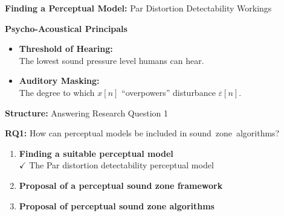 \documentclass[aspectratio=169]{beamer}
\begin{document}
\begin{frame}{\textbf{Finding a Perceptual Model:} Par Distortion Detectability Workings}
    \begin{block}
        {\textbf{Psycho-Acoustical Principals}}
        \begin{itemize}
            \item \textbf{Threshold of Hearing:}\\The lowest sound pressure level humans can hear.
            \vspace{3pt}
            \item \textbf{Auditory Masking:}\\
                The degree to which $x[n]$ ``overpowers'' disturbance $\varepsilon[n]$.  
            \vspace{3pt}
        \end{itemize}
    \end{block}
\end{frame}

\begin{frame}{\textbf{Structure:} Answering Research Question 1}
    \begin{block}{\textbf{RQ1:} How can perceptual models be included in sound~zone~algorithms?}
        \begin{enumerate}
            \item \textbf{Finding a suitable perceptual model}
                \\{{$\mathbf{\checkmark}$} The Par distortion detectability perceptual model}\vspace{3pt}
            \item \textbf{Proposal of a perceptual sound zone framework}
                \\\vspace{3pt}
            \item \textbf{Proposal of perceptual sound zone algorithms}
                \\\vspace{3pt}
        \end{enumerate}
    \end{block}
\end{frame}
\end{document}
